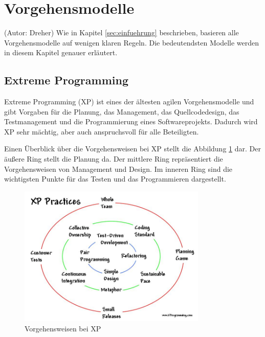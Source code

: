 \section{Vorgehensmodelle}
(Autor: Dreher)
Wie in Kapitel \ref{sec:einfuehrung} beschrieben, basieren alle Vorgehensmodelle auf wenigen klaren Regeln. Die bedeutendsten Modelle werden in diesem Kapitel genauer erläutert.

\subsection{Extreme Programming}
Extreme Programming (XP) ist eines der ältesten agilen Vorgehensmodelle und gibt Vorgaben für die Planung, das Management, das Quellcodedesign, das Testmanagement und die Programmierung eines Softwareprojekts. Dadurch wird XP sehr mächtig, aber auch anspruchsvoll für alle Beteiligten. \cite[S. 13]{bib:wolfRoock} \cite{bib:xp}

Einen Überblick über die Vorgehensweisen bei XP stellt die Abbildung \ref{fig:xppractices} dar. Der äußere Ring stellt die Planung da. Der mittlere Ring repräsentiert die Vorgehensweisen von Management und Design. Im inneren Ring sind die wichtigsten Punkte für das Testen und das Programmieren dargestellt.

\begin{figure}[h]
  \centering
  \includegraphics[width=0.8\textwidth]{images/xpCircles}
  \caption{Vorgehensweisen bei XP \cite{bib:xprogamming}}
  \label{fig:xppractices}
\end{figure}

